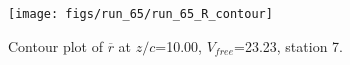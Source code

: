 \begin{figure}[H]
\centering
\texttt{[image: figs/run\_65/run\_65\_R\_contour]}
\caption{Contour plot of $\overline{r}$ at $z/c$=10.00, $V_{free}$=23.23, station 7.}
\label{fig:run_65_R_contour}
\end{figure}


